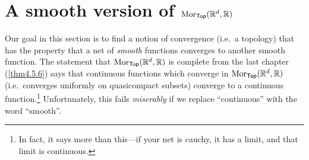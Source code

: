 \section{A smooth version of $\operatorname{Mor} _{\mathsf{Top}}(\mathbb{R} ^d,\mathbb{R} )$}

Our goal in this section is to find a notion of convergence (i.e.~a topology) that has the property that a net of \emph{smooth} functions converges to another smooth function.  The statement that $\operatorname{Mor} _{\mathsf{Top}}(\mathbb{R} ^d,\mathbb{R} )$ is complete from the last chapter (\cref{thm4.5.6}) says that continuous functions which converge in $\operatorname{Mor} _{\mathsf{Top}}(\mathbb{R} ^d,\mathbb{R} )$ (i.e.~converges uniformly on quasicompact subsets) converge to a continuous function.\footnote{In fact, it says more than this---if your net is cauchy, it has a limit, and that limit is continuous.}  Unfortunately, this fails \emph{miserably} if we replace ``continuous'' with the word ``smooth''.

\begin{exm}

\end{exm}

